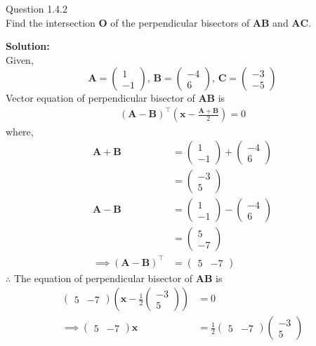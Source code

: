 \documentclass[journal,12pt,twocolumn]{IEEEtran}
\theoremstyle{remark}
\newcommand{\myvec}[1]{\ensuremath{\begin{pmatrix}#1\end{pmatrix}}}
\providecommand{\brak}[1]{\ensuremath{\left(#1\right)}}
\let\vec\mathbf
\newcommand{\solution}{\noindent \textbf{Solution: }}
\begin{document}
%

Question 1.4.2\\
Find the intersection $\vec{O}$ of the perpendicular bisectors of $\vec{AB}$ and $\vec{AC}$.

\solution \\
Given,
$$\vec{A}=\myvec{1\\-1} ,\, \vec{B}=\myvec{-4\\6} ,\, \vec{C}=\myvec{-3\\-5}$$
Vector equation of perpendicular bisector of $\vec{AB}$ is
\begin{align}
 (\vec{A}-\vec{B})^\top  \brak{ \vec{x} - \frac{\vec{A}+\vec{B}}{2}} = 0
\end{align}
where,
\begin{align}
\vec{A}+\vec{B}&=\myvec{1\\-1}+\myvec{-4\\6}\\
&=\myvec{-3\\5}\\
\vec{A}-\vec{B} &= \myvec{1\\-1}-\myvec{-4\\6}\\
&=\myvec{5\\-7}\\
\implies (\vec{A}-\vec{B})^\top &= \myvec{5&-7}
\end{align}
$\therefore $ The equation of perpendicular bisector of $\vec{AB}$ is
\begin{align}
\myvec{5&-7} \brak{ \vec{x}-\frac{1}{2}\myvec{-3\\5} }&=0\\
\implies \myvec{5&-7}\vec{x}&=\frac{1}{2}\myvec{5&-7}\myvec{-3\\5}
\end{align}
\end{document}
